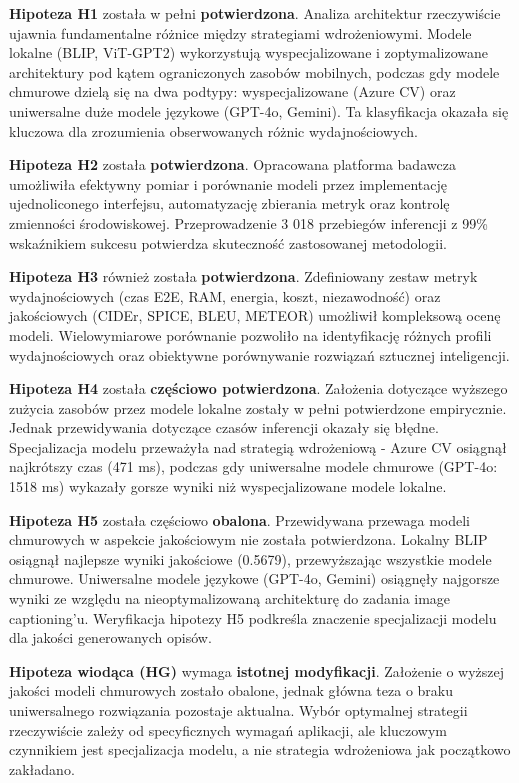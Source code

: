 \textbf{Hipoteza H1} została w pełni \textbf{potwierdzona}. Analiza architektur rzeczywiście ujawnia fundamentalne różnice
między strategiami wdrożeniowymi. Modele lokalne (BLIP, ViT-GPT2) wykorzystują wyspecjalizowane i zoptymalizowane architektury
pod kątem ograniczonych zasobów mobilnych, podczas gdy modele chmurowe dzielą się na dwa podtypy:
wyspecjalizowane (Azure CV) oraz uniwersalne duże modele językowe (GPT-4o, Gemini). Ta klasyfikacja okazała się
kluczowa dla zrozumienia obserwowanych różnic wydajnościowych.

\textbf{Hipoteza H2} została \textbf{potwierdzona}. Opracowana platforma badawcza  umożliwiła efektywny pomiar
i porównanie modeli przez implementację ujednoliconego interfejsu, automatyzację zbierania metryk oraz kontrolę
zmienności środowiskowej. Przeprowadzenie 3 018 przebiegów inferencji z 99\% wskaźnikiem sukcesu potwierdza
skuteczność zastosowanej metodologii.

\textbf{Hipoteza H3} również została \textbf{potwierdzona}. Zdefiniowany zestaw metryk wydajnościowych (czas E2E, RAM, energia, 
koszt, niezawodność) oraz jakościowych (CIDEr, SPICE, BLEU, METEOR) umożliwił kompleksową ocenę modeli.
Wielowymiarowe porównanie pozwoliło na identyfikację różnych profili wydajnościowych oraz obiektywne porównywanie rozwiązań sztucznej inteligencji.

\textbf{Hipoteza H4} została \textbf{częściowo potwierdzona}. Założenia dotyczące wyższego zużycia zasobów przez modele lokalne
zostały w pełni potwierdzone empirycznie. Jednak przewidywania dotyczące czasów inferencji okazały się błędne.
Specjalizacja modelu przeważyła nad strategią wdrożeniową - Azure CV osiągnął najkrótszy czas (471 ms), 
podczas gdy uniwersalne modele chmurowe (GPT-4o: 1518 ms) wykazały gorsze wyniki niż wyspecjalizowane modele lokalne.

\textbf{Hipoteza H5} została częściowo \textbf{obalona}. Przewidywana przewaga modeli chmurowych w aspekcie jakościowym
nie została potwierdzona. Lokalny BLIP osiągnął najlepsze wyniki jakościowe (0.5679), przewyższając wszystkie modele chmurowe.
Uniwersalne modele językowe (GPT-4o, Gemini) osiągnęły najgorsze wyniki ze względu na nieoptymalizowaną architekturę
do zadania image captioning'u. Weryfikacja hipotezy H5 podkreśla znaczenie specjalizacji modelu
dla jakości generowanych opisów.

\textbf{Hipoteza wiodąca (HG)} wymaga \textbf{istotnej modyfikacji}. Założenie o wyższej jakości modeli chmurowych
zostało obalone, jednak główna teza o braku uniwersalnego rozwiązania pozostaje aktualna.
Wybór optymalnej strategii rzeczywiście zależy od specyficznych wymagań aplikacji, ale kluczowym czynnikiem
jest specjalizacja modelu, a nie strategia wdrożeniowa jak początkowo zakładano.

